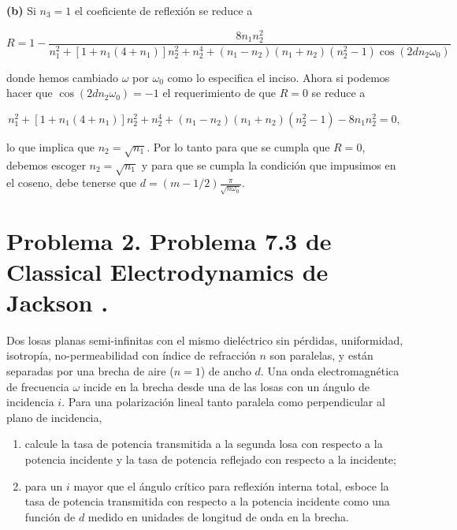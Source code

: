 \documentclass[a4paper,11pt]{article}
\numberwithin{equation}{section}
\begin{document}
\textbf{(b)} Si $n_3 = 1$ el coeficiente de reflexión se reduce a 

\begin{equation}
 R = 1 - \frac{8n_1 n_2^2}{n_1^2 + [1 + n_1(4 + n_1)]n_2^2 + n_2^4 + 
 (n_1 - n_2)(n_1 + n_2)(n_2^2 - 1)\cos{(2 d n_2 \omega_0)}}
\end{equation}

donde hemos cambiado $\omega$ por $\omega_0$ como lo especifica el inciso. Ahora 
si podemos hacer que $\cos{(2 d n_2 \omega_0)} = -1$ el requerimiento de que $R = 0$ 
se reduce a 

\begin{equation}
 n_1^2 + [1 + n_1(4 + n_1)]n_2^2 + n_2^4 + 
 (n_1 - n_2)(n_1 + n_2)(n_2^2 - 1) - 8n_1 n_2^2 = 0,
\end{equation}

lo que implica que $n_2 = \sqrt{n_1}$. Por lo tanto para que se cumpla que $R=0$, debemos 
escoger $n_2 = \sqrt{n_1}$ y para que se cumpla la condición que impusimos en el 
coseno, debe tenerse que $d = (m - 1/2)\frac{\pi}{\sqrt{n\omega_0}}$.

\newpage

\section{Problema 2. Problema 7.3 de Classical Electrodynamics
de Jackson \cite{jackson}.}

Dos losas planas semi-infinitas con el mismo dieléctrico sin pérdidas, uniformidad,
isotropía, no-permeabilidad con índice de refracción $n$ son paralelas, y están 
separadas por una brecha de aire ($n = 1$) de ancho $d$. Una onda electromagnética 
de frecuencia $\omega$ incide en la brecha desde una de las losas con un ángulo 
de incidencia $i$. Para una polarización lineal tanto paralela como perpendicular 
al plano de incidencia,

\begin{enumerate}[label=\textbf{(\alph*)}]
 \item calcule la tasa de potencia transmitida a la segunda losa con respecto 
 a la potencia incidente y la tasa de potencia reflejado con respecto a la incidente;
 \item para un $i$ mayor que el ángulo crítico para reflexión interna total, 
 esboce la tasa de potencia transmitida con respecto a la potencia incidente 
 como una función de $d$ medido en unidades de longitud de onda en la brecha.
\end{enumerate}
\end{document}
